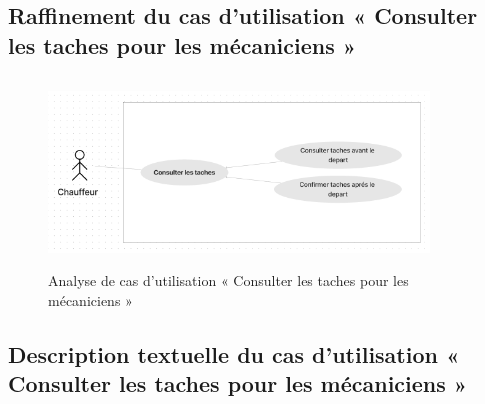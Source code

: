 \newpage
\subsection{Raffinement du cas d'utilisation « Consulter les taches pour les mécaniciens »}
\begin{figure}[h!]
  \centering
  \includegraphics[width=0.9\textwidth,height=5cm]{chap4.images/raf consulter mec.png}
  \caption{Analyse de cas d’utilisation « Consulter les taches pour les mécaniciens »}

\end{figure}

\subsection{Description textuelle du cas d’utilisation « Consulter les taches pour les mécaniciens »}

